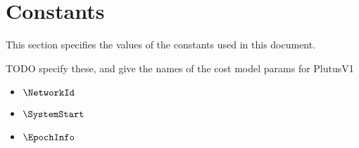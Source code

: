 \section{Constants}

This section specifies the values of the constants used in this document.

\begin{note}
  TODO specify these, and give the names of the cost model params for PlutusV1
\end{note}

\begin{itemize}
  \item $\NetworkId$

  \item $\SystemStart$

  \item $\EpochInfo$

\end{itemize}
